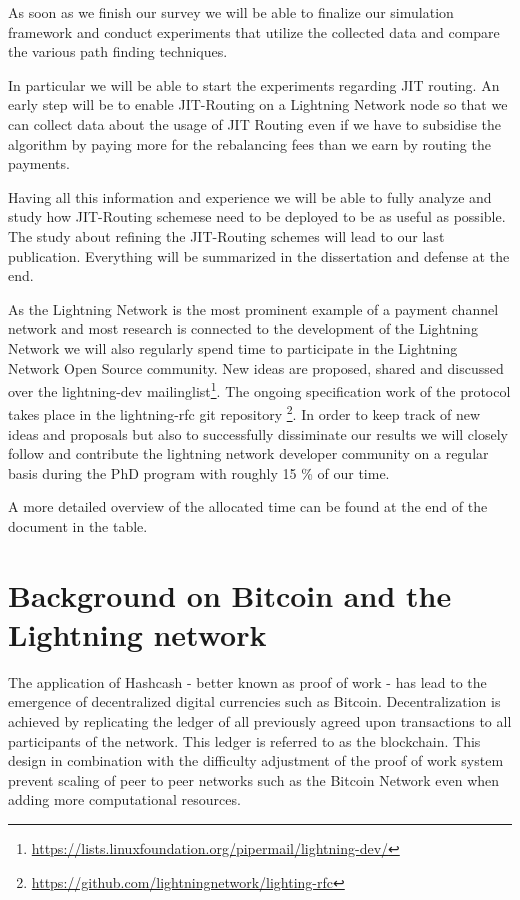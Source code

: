 \documentclass[a4paper]{paper}
\begin{document}
As soon as we finish our survey we will be able to finalize our simulation framework and conduct experiments that utilize the collected data and compare the various path finding techniques.

In particular we will be able to start the experiments regarding JIT routing.
An early step will be to enable JIT-Routing on a Lightning Network node so that we can collect data about the usage of JIT Routing even if we have to subsidise the algorithm by paying more for the rebalancing fees than we earn by routing the payments.

Having all this information and experience we will be able to fully analyze and study how JIT-Routing schemese need to be deployed to be as useful as possible.
The study about refining the JIT-Routing schemes will lead to our last publication.
Everything will be summarized in the dissertation and defense at the end.

As the Lightning Network is the most prominent example of a payment channel network and most research is connected to the development of the Lightning Network we will also regularly spend time to participate in the Lightning Network Open Source community.
New ideas are proposed, shared and discussed over the lightning-dev mailinglist\footnote{\url{https://lists.linuxfoundation.org/pipermail/lightning-dev/}}.
The ongoing specification work of the protocol takes place in the lightning-rfc git repository \footnote{\url{https://github.com/lightningnetwork/lighting-rfc}}.
In order to keep track of new ideas and proposals but also to successfully dissiminate our results we will closely follow and contribute the lightning network developer community on a regular basis during the PhD program with roughly 15 \% of our time.

A more detailed overview of the allocated time can be found at the end of the document in the table.




\appendix
\section{Background on Bitcoin and the Lightning network}
The application of Hashcash \cite{back2002hashcash} - better known as proof of work -  has lead to the emergence of decentralized digital currencies such as Bitcoin\cite{nakamoto2008bitcoin}.
Decentralization is achieved by replicating the ledger of all previously agreed upon transactions to all participants of the network.
This ledger is referred to as the blockchain.
This design in combination with the difficulty adjustment of the proof of work system prevent scaling of peer to peer networks such as the Bitcoin Network even when adding more computational resources.
\end{document}
